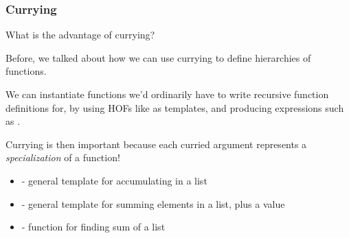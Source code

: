 \documentclass[aspectratio=169]{beamer}
\begin{document}
\begin{frame}[fragile]
  \frametitle{Currying}

  What is the advantage of currying?

  \pause
  \vspace{\fill}

  Before, we talked about how we can use currying to define hierarchies of functions.

  \pause
  \vspace{\fill}

  We can instantiate functions we'd ordinarily have to write recursive function definitions
  for, by using HOFs like  as templates, and producing expressions such as
  .

  \pause
  \vspace{\fill}

  Currying is then important because each curried argument represents a \textit{specialization}
  of a function!

  \pause
  \vspace{\fill}

  \begin{itemize}
    \item {} - general template for accumulating in a list \pause
    \item {} - general template for summing elements in a list, plus a value \pause
    \item {} - function for finding sum of a list
  \end{itemize}
\end{frame}
\end{document}
